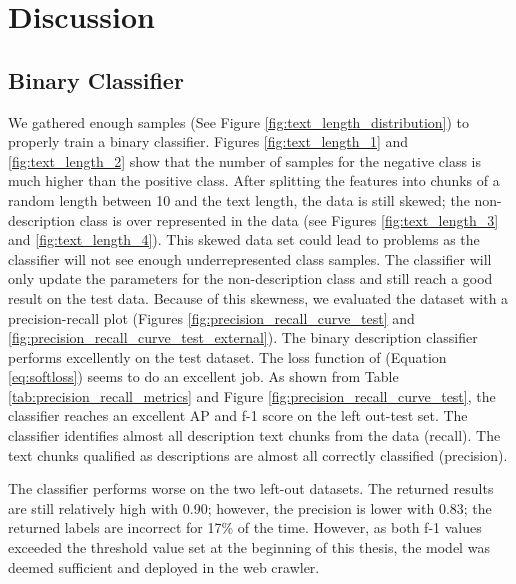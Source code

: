 \documentclass[a4paper, 12pt, oneside]{book} %
\begin{document}
\newpage
\section{Discussion} \label{par:discussion}

\subsection{Binary Classifier}
We gathered enough samples (See Figure \ref{fig:text_length_distribution}) to properly train a binary classifier.
Figures \ref{fig:text_length_1} and \ref{fig:text_length_2} show that the number of samples for the negative class is much higher than the positive class. 
After splitting the features into chunks of a random length between 10 and the text length, the data is still skewed; the non-description class is over represented in the data (see Figures \ref{fig:text_length_3} and \ref{fig:text_length_4}). 
This skewed data set could lead to problems as the classifier will not see enough underrepresented class samples.
The classifier will only update the parameters for the non-description class and still reach a good result on the test data.
Because of this skewness, we evaluated the dataset with a precision-recall plot (Figures \ref{fig:precision_recall_curve_test} and \ref{fig:precision_recall_curve_test_external}).
The binary description classifier performs excellently on the test dataset. 
The loss function of \textcite{reed_training_2015} (Equation \ref{eq:softloss}) seems to do an excellent job.
As shown from Table \ref{tab:precision_recall_metrics} and Figure \ref{fig:precision_recall_curve_test}, the classifier reaches an excellent AP and f-1 score on the left out-test set.
The classifier identifies almost all description text chunks from the data (recall).
The text chunks qualified as descriptions are almost all correctly classified (precision).

The classifier performs worse on the two left-out datasets. 
The returned results are still relatively high with 0.90; however, the precision is lower with 0.83; the returned labels are incorrect for 17\% of the time.
However, as both f-1 values exceeded the threshold value set at the beginning of this thesis, the model was deemed sufficient and deployed in the web crawler. 
\end{document}
